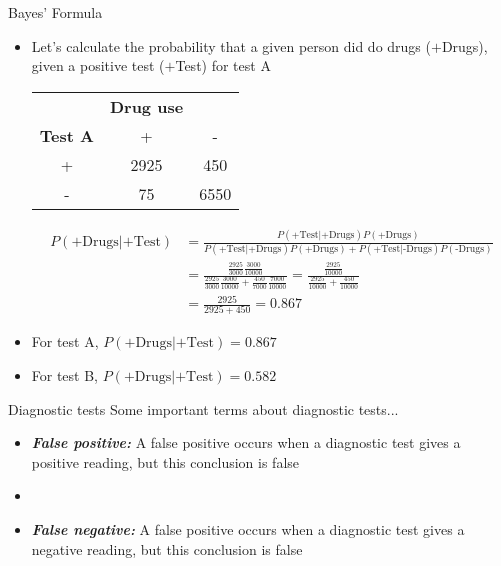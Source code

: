 \documentclass[xcolor=dvipsnames]{beamer}
\begin{document}
\begin{frame}{Bayes' Formula}
\begin{itemize}
	\item Let's calculate the probability that a given person did do drugs ($+$Drugs), given a positive test ($+$Test) for test A
	\begin{center}
		\begin{tabular}{c|cc}
			& \textbf{Drug use} & \\
			\textbf{Test A} & + & - \\ \hline
			+ & 2925 & 450 \\
			- & 75 & 6550\\
		\end{tabular}
	\end{center}\pause
{\scriptsize
\begin{align*}
P(\text{+Drugs}|\text{+Test}) &= \frac{P(\text{+Test}|+\text{Drugs}) P(\text{+Drugs})}{P(\text{+Test}|\text{+Drugs}) P(\text{+Drugs}) + P(\text{+Test}|\text{-Drugs}) P(\text{-Drugs})} \\
&= \frac{\frac{2925}{3000} \frac{3000}{10000}}{\frac{2925}{3000} \frac{3000}{10000} + \frac{450}{7000}\frac{7000}{10000}} = \frac{\frac{2925}{10000}}{\frac{2925}{10000}+\frac{450}{10000}} \\
&= \frac{2925}{2925 + 450} = 0.867
\end{align*}
}\pause
\item For test A, $P(\text{+Drugs}|\text{+Test}) = 0.867$\pause
\item For test B, $P(\text{+Drugs}|\text{+Test}) = 0.582$ 
\end{itemize}
\end{frame}

\begin{frame}{Diagnostic tests}
	Some important terms about diagnostic tests... \pause
	\begin{itemize}
		\item \textbf{\emph{False positive:}} A false positive occurs when a diagnostic test gives a positive reading, but this conclusion is false \pause
		\item[]
		\item \textbf{\emph{False negative:}} A false positive occurs when a diagnostic test gives a negative reading, but this conclusion is false 
	\end{itemize}
\end{frame}
\end{document}
